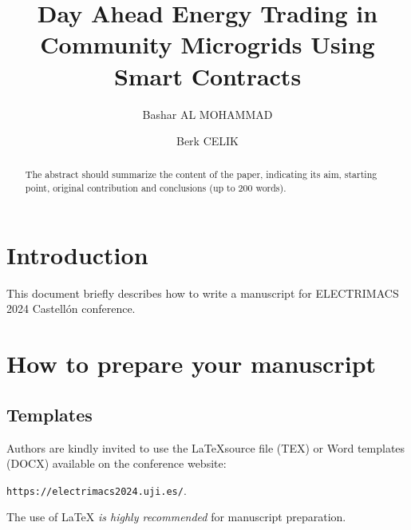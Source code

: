 \documentclass[smallextended,twocolumn]{electrimacs2024}
\begin{document}
%
\title{Day Ahead Energy Trading in Community Microgrids Using Smart Contracts}

\author{Bashar AL MOHAMMAD \and Berk CELIK}

\maketitle


\begin{abstract}
The abstract should summarize the content of the paper, indicating its
aim, starting point, original contribution and conclusions (up to 200 words).
\end{abstract}

\section{Introduction}
This document briefly describes how to write a manuscript for ELECTRIMACS 2024 Castell\'on conference.


\section{How to prepare your manuscript}


\subsection{Templates}
Authors are kindly invited to use the \LaTeX source file (TEX) or Word templates (DOCX) available on the conference website:
\begin{center}
\texttt{https://electrimacs2024.uji.es/}.
\end{center}
The use of LaTeX \emph{is highly recommended} for manuscript preparation.
\end{document}
